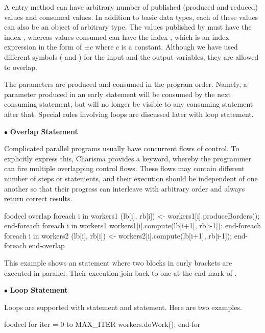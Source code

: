 A entry method can have arbitrary number of published (produced and reduced)
values and consumed values. In addition to basic data types, each of these
values can also be an object of arbitrary type. The values published by
 must have the index , whereas values consumed can have the
index , which is an index expression in the form of $\pm c$
where $c$ is a constant. Although we have used different symbols ( and
) for the input and the output variables, they are allowed to overlap. 

The parameters are produced and consumed in the program order. Namely, a
parameter produced in an early statement will be consumed by the next consuming
statement, but will no longer be visible to any consuming statement after that.
Special rules involving loops are discussed later with loop statement.

$\bullet$ {\bf Overlap Statement}

Complicated parallel programs usually have concurrent flows of control. To
explicitly express this, Charisma provides a  keyword, whereby the
programmer can fire multiple overlapping control flows. These flows may contain
different number of steps or statements, and their execution should be
independent of one another so that their progress can interleave with arbitrary
order and always return correct results. 

\begin{SaveVerbatim}{foodecl}
  overlap
  {
    foreach i in workers1
      (lb[i], rb[i]) <- workers1[i].produceBorders();
    end-foreach
    foreach i in workers1
      workers1[i].compute(lb[i+1], rb[i-1]);
    end-foreach
  }
  {
    foreach i in workers2
      (lb[i], rb[i]) <- workers2[i].compute(lb[i+1], rb[i-1]);
    end-foreach
  }
  end-overlap
\end{SaveVerbatim}

This example shows an  statement where two blocks in curly
brackets are executed in parallel. Their execution join back to one at the end
mark of . 

$\bullet$ {\bf Loop Statement}

Loops are supported with  statement and  statement. Here
are two examples.
\begin{SaveVerbatim}{foodecl}
  for iter = 0 to MAX_ITER
     workers.doWork();
  end-for
\end{SaveVerbatim}
  
